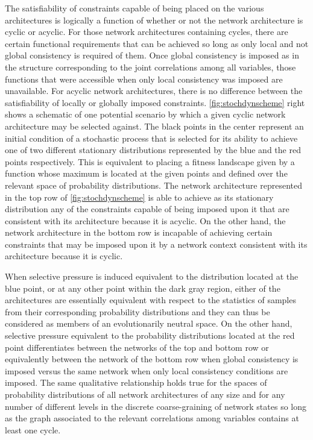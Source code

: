 The satisfiability of constraints capable of being placed on the various architectures is logically a function of whether or not the network architecture is cyclic or acyclic. For those network architectures containing cycles, there are certain functional requirements that can be achieved so long as only local and not global consistency is required of them. Once global consistency is imposed as in the structure corresponding to the joint correlations among all variables, those functions that were accessible when only local consistency was imposed are unavailable. For acyclic network architectures, there is no difference between the satisfiability of locally or globally imposed constraints. \autoref{fig:stochdynscheme} right shows a schematic of one potential scenario by which a given cyclic network architecture may be selected against. The black points in the center represent an initial condition of a stochastic process that is selected for its ability to achieve one of two different stationary distributions represented by the blue and the red points respectively. This is equivalent to placing a fitness landscape given by a function whose maximum is located at the given points and defined over the relevant space of probability distributions. The network architecture represented in the top row of \autoref{fig:stochdynscheme} is able to achieve as its stationary distribution any of the constraints capable of being imposed upon it that are consistent with its architecture because it is acyclic. On the other hand, the network architecture in the bottom row is incapable of achieving certain constraints that may be imposed upon it by a network context consistent with its architecture because it is cyclic.

When selective pressure is induced equivalent to the distribution located at the blue point, or at any other point within the dark gray region, either of the architectures are essentially equivalent with respect to the statistics of samples from their corresponding probability distributions and they can thus be considered as members of an evolutionarily neutral space. On the other hand, selective pressure equivalent to the probability distributions located at the red point differentiates between the networks of the top and bottom row or equivalently between the network of the bottom row when global consistency is imposed versus the same network when only local consistency conditions are imposed. The same qualitative relationship holds true for the spaces of probability distributions of all network architectures of any size and for any number of different levels in the discrete coarse-graining of network states so long as the graph associated to the relevant correlations among variables contains at least one cycle.

